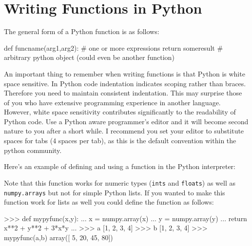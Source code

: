 

\section{Writing Functions in Python}

The general form of a Python function is as follows:
%
\begin{python}
def funcname(arg1,arg2):
    # one or more expressions
    return someresult # arbitrary python object (could even be another function)
\end{python}
%
An important thing to remember when writing functions is that Python is
white space sensitive. In Python code indentation indicates scoping
rather than braces. Therefore you need to maintain consistent
indentation. This may surprise those of you who have extensive
programming experience in another language. However, white space
sensitivity contributes significantly to the readability of Python code.
Use a Python aware programmer's editor and it will become second nature
to you after a short while. I recommend you set your editor to
substitute spaces for tabs (4 spaces per tab), as this is the default
convention within the python community.

Here's an example of defining and using a function in the Python
interpreter:
%
%
Note that this function works for numeric types (\lstinline!ints! and
\lstinline!floats!) as well as \lstinline!numpy.arrays! but not for
simple Python lists. If you wanted to make this function work for lists
as well you could define the function as follows:
%
\begin{python}
>>> def mypyfunc(x,y):
...     x = numpy.array(x)
...     y = numpy.array(y)
...     return x**2 + y**2 + 3*x*y
... 
>>> a
[1, 2, 3, 4]
>>> b
[1, 2, 3, 4]
>>> mypyfunc(a,b)
array([ 5, 20, 45, 80])
\end{python}


